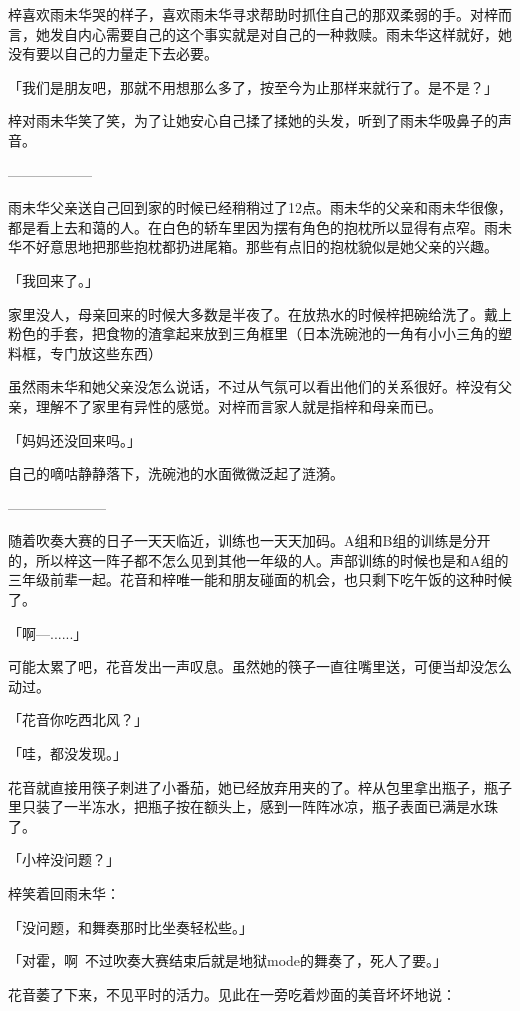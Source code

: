 \documentclass[UTF8]{ctexart}
\begin{document}
    梓喜欢雨未华哭的样子，喜欢雨未华寻求帮助时抓住自己的那双柔弱的手。对梓而言，她发自内心需要自己的这个事实就是对自己的一种救赎。雨未华这样就好，她没有要以自己的力量走下去必要。

    「我们是朋友吧，那就不用想那么多了，按至今为止那样来就行了。是不是？」

    梓对雨未华笑了笑，为了让她安心自己揉了揉她的头发，听到了雨未华吸鼻子的声音。

    ——————

    雨未华父亲送自己回到家的时候已经稍稍过了12点。雨未华的父亲和雨未华很像，都是看上去和蔼的人。在白色的轿车里因为摆有角色的抱枕所以显得有点窄。雨未华不好意思地把那些抱枕都扔进尾箱。那些有点旧的抱枕貌似是她父亲的兴趣。

    「我回来了。」

    家里没人，母亲回来的时候大多数是半夜了。在放热水的时候梓把碗给洗了。戴上粉色的手套，把食物的渣拿起来放到三角框里（日本洗碗池的一角有小小三角的塑料框，专门放这些东西）

    虽然雨未华和她父亲没怎么说话，不过从气氛可以看出他们的关系很好。梓没有父亲，理解不了家里有异性的感觉。对梓而言家人就是指梓和母亲而已。

    「妈妈还没回来吗。」

    自己的嘀咕静静落下，洗碗池的水面微微泛起了涟漪。

    ———————

    随着吹奏大赛的日子一天天临近，训练也一天天加码。A组和B组的训练是分开的，所以梓这一阵子都不怎么见到其他一年级的人。声部训练的时候也是和A组的三年级前辈一起。花音和梓唯一能和朋友碰面的机会，也只剩下吃午饭的这种时候了。

    「啊—......」

    可能太累了吧，花音发出一声叹息。虽然她的筷子一直往嘴里送，可便当却没怎么动过。

    「花音你吃西北风？」

    「哇，都没发现。」

    花音就直接用筷子刺进了小番茄，她已经放弃用夹的了。梓从包里拿出瓶子，瓶子里只装了一半冻水，把瓶子按在额头上，感到一阵阵冰凉，瓶子表面已满是水珠了。

    「小梓没问题？」

    梓笑着回雨未华：

    「没问题，和舞奏那时比坐奏轻松些。」

    「对霍，啊~不过吹奏大赛结束后就是地狱mode的舞奏了，死人了要。」

    花音萎了下来，不见平时的活力。见此在一旁吃着炒面的美音坏坏地说：
\end{document}
